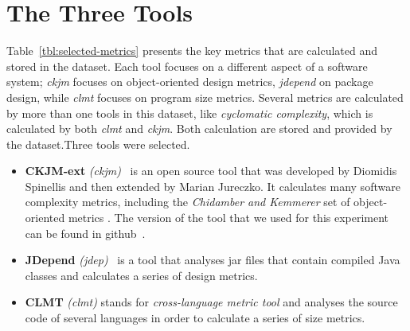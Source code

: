 \documentclass{sig-alternate}
\begin{document}
\section{The Three Tools}

Table~\ref{tbl:selected-metrics} presents the key metrics that are calculated and stored in the dataset. Each tool focuses on a different aspect of a software system; \textit{ckjm} focuses on object-oriented design metrics, \textit{jdepend} on package design, while \textit{clmt} focuses on program size metrics. Several metrics are calculated by more than one tools in this dataset, like \textit{cyclomatic complexity}, which is calculated by both \textit{clmt} and \textit{ckjm}. Both calculation are stored and provided by the dataset.Three tools were selected.

\begin{itemize}
  \item \textbf{CKJM-ext} \textit{(ckjm)}~\cite{Spi05g} is an open source tool that was developed by Diomidis Spinellis and then extended by Marian Jureczko. It calculates many software complexity metrics, including the \textit{Chidamber and Kemmerer} set of object-oriented metrics \cite{CHKE94}. The version of the tool that we used for this experiment can be found in github~\cite{CKJM}.

  \item \textbf{JDepend} \textit{(jdep)}~\cite{JDEPEND} is a tool that analyses {\sc jar} files that contain compiled Java classes and calculates a series of design metrics.

  \item \textbf{CLMT} \textit{(clmt)} stands for \textit{cross-language metric tool} and analyses the source code of several languages in order to calculate a series of size metrics.
\end{itemize}
\end{document}
